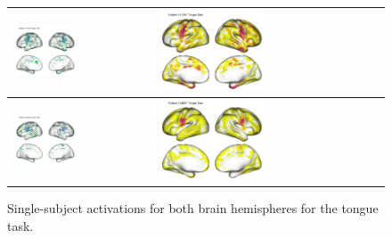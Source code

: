 \documentclass{article}
\begin{document}
\begin{figure}
\begin{tabularx}{\textwidth}{|X|X|}
			\includegraphics[width=0.48\textwidth]{plots/603_subject_111312_tongue_task_activations_classical.png} &
			\includegraphics[width=0.48\textwidth]{plots/603_subject_111312_tongue_task_activations.png} \\ \hline
			\includegraphics[width=0.48\textwidth]{plots/603_subject_114823_tongue_task_activations_classical.png} &
			\includegraphics[width=0.48\textwidth]{plots/603_subject_114823_tongue_task_activations.png} \\ \hline
		\end{tabularx}
		\caption{Single-subject activations for both brain hemispheres for the tongue task.}
		\label{fig:tongue_act_single_subject}
	\end{figure}
	
\end{document}
